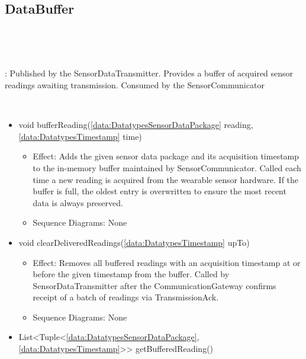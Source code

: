   \subsection{DataBuffer}\label{int:InterfacesDataBuffer}
    \begin{description}
      \item[Provided by:] \iconcomponent{}~
      \item[Required by:] \iconcomponent{}~ 
           \item[Description]: Published by the SensorDataTransmitter. Provides a buffer of acquired sensor readings awaiting transmission. Consumed by the SensorCommunicator
      \item[Operations:] ~
    \begin{itemize}[noitemsep,nolistsep,leftmargin=-.25cm]
      \item \textsf{void bufferReading(\ref{data:DatatypesSensorDataPackage} reading, \ref{data:DatatypesTimestamp} time)}
        \begin{itemize}[noitemsep,nolistsep]
           \item Effect: Adds the given sensor data package and its acquisition timestamp to the in-memory buffer maintained by SensorCommunicator. Called each time a new reading is acquired from the wearable sensor hardware. If the buffer is full, the oldest entry is overwritten to ensure the most recent data is always preserved. 
           \item Sequence Diagrams: None
        \end{itemize}
      \item \textsf{void clearDeliveredReadings(\ref{data:DatatypesTimestamp} upTo)}
        \begin{itemize}[noitemsep,nolistsep]
           \item Effect: Removes all buffered readings with an acquisition timestamp at or before the given timestamp from the buffer. Called by SensorDataTransmitter after the CommunicationGateway confirms receipt of a batch of readings via TransmissionAck. 
           \item Sequence Diagrams: None
        \end{itemize}
      \item \textsf{List\textless{}Tuple\textless{}\ref{data:DatatypesSensorDataPackage}, \ref{data:DatatypesTimestamp}\textgreater{}\textgreater{} getBufferedReading()}

\end{itemize}
\end{description}
